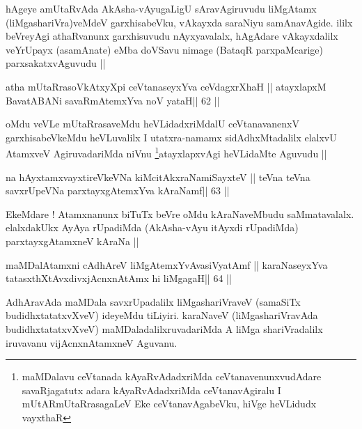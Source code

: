 \begin{artha}
hAgeye amUtaRvAda AkAsha-vAyugaLigU sAravAgiruvudu liMgAtamx
(liMgashariVra)veMdeV garxhisabeVku, vAkayxda saraNiyu samAnavAgide.
ililx beVreyAgi athaRvanunx garxhisuvudu nAyxyavalalx, hAgAdare
vAkayxdalilx veYrUpayx (asamAnate) eMba doVSavu nimage (BataqR
parxpaMcarige) parxsakatxvAguvudu ||
\end{artha}



\begin{shl}
atha mUtaRrasoVkAtxyX\s pi ceVtanaseyxYva ceVdagxrXhaH ||
atayxlapxM BavatA\s BANi savaRmAtemxYva noV yataH\hfill || 62 ||
\end{shl}

\begin{artha}
oMdu veVLe mUtaRrasaveMdu heVLidadxriMdalU ceVtanavanenxV
garxhisabeVkeMdu heVLuvalilx I utatxra-namamx sidAdhxMtadalilx elalxvU
AtamxveV AgiruvadariMda niVnu \footnote{maMDalavu ceVtanada
kAyaRvAdadxriMda ceVtanavenunxvudAdare savaRjagatutx adara
kAyaRvAdadxriMda ceVtanavAgiralu I mUtARmUtaRrasagaLeV
Eke ceVtanavAgabeVku, hiVge heVLidudx vayxthaR}atayxlapxvAgi heVLidaMte
Aguvudu ||
\end{artha}



\begin{shl}
na hAyxtamxvayxtireVkeVNa kiMcitAkxraNamiSayxteV ||
teVna teVna savxrUpeVNa parxtayxgAtemxYva kAraNamf\hfill || 63 ||
\end{shl}

\begin{artha}
EkeMdare ! Atamxnanunx biTuTx beVre oMdu kAraNaveMbudu saMmatavalalx.
elalxdakUkx AyAya rUpadiMda (AkAsha-vAyu itAyxdi rUpadiMda)
parxtayxgAtamxneV kAraNa ||
\end{artha}



\begin{shl}
maMDalAtamxni cA\s\s dhAreV liMgAtemxYvAvasiVyatAmf ||
karaNaseyxYva tatasxthXtAvxdivxjAcnxnAtAmx hi liMgagaH\hfill || 64 ||
\end{shl}

\begin{artha}
AdhAravAda maMDala savxrUpadalilx liMgashariVraveV (samaSiTx
budidhxtatatxvXveV) ideyeMdu tiLiyiri. karaNaveV (liMgashariVravAda
budidhxtatatxvXveV) maMDaladalilxruvadariMda A liMga shariVradalilx
iruvavanu vijAcnxnAtamxneV Aguvanu.
\end{artha}

